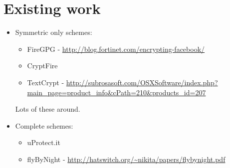 \section{Existing work}
\begin{itemize}
    \item Symmetric only schemes:
    
    \begin{itemize}
        \item FireGPG - \url{http://blog.fortinet.com/encrypting-facebook/}
        \item CryptFire
        \item TextCrypt - \url{http://subrosasoft.com/OSXSoftware/index.php?main_page=product_info&cPath=210&products_id=207}
    \end{itemize}
    
    Lots of these around.
    
    \item Complete schemes:
    
    \begin{itemize}
        \item uProtect.it
        \item flyByNight - \url{http://hatswitch.org/~nikita/papers/flybynight.pdf}
    \end{itemize}
\end{itemize}




